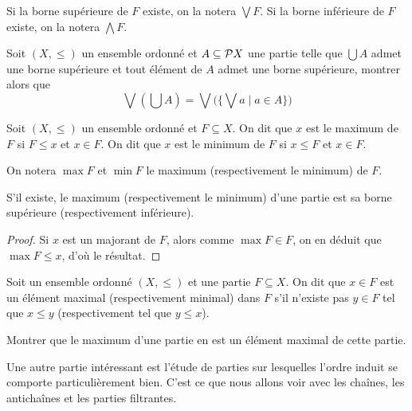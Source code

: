 \begin{notation}
  Si la borne supérieure de $F$ existe, on la notera $\bigvee F$. Si la borne
  inférieure de $F$ existe, on la notera $\bigwedge F$.
\end{notation}

\begin{exercise}
  Soit $(X,\leq)$ un ensemble ordonné et $A\subseteq \mathcal{P} X$ une partie
  telle que $\bigcup A$ admet une borne supérieure et tout élément de $A$ admet
  une borne supérieure, montrer alors que
  \[\bigvee (\bigcup A) =
  \bigvee\Big(\Big\{ \bigvee a \;\Big|\; a \in A\Big\}\Big)\]
\end{exercise}

\begin{definition}
  Soit $(X,\leq)$ un ensemble ordonné et $F\subseteq X$. On dit que $x$ est le
  maximum de $F$ si $F\leq x$ et $x\in F$. On dit que $x$ est le minimum de $F$
  si $x\leq F$ et $x\in F$.
\end{definition}

\begin{notation}
  On notera $\max F$ et $\min F$ le maximum (respectivement le minimum) de $F$.
\end{notation}

\begin{property}
  S'il existe, le maximum (respectivement le minimum) d'une partie est sa borne
  supérieure (respectivement inférieure).
\end{property}

\begin{proof}
  Si $x$ est un majorant de $F$, alors comme $\max F \in F$, on en déduit que
  $\max F \leq x$, d'où le résultat.
\end{proof}

\begin{definition}
  Soit un ensemble ordonné $(X,\leq)$ et une partie $F\subseteq X$. On dit que
  $x \in F$ est un élément maximal (respectivement minimal) dans $F$ s'il
  n'existe pas $y\in F$ tel que $x\leq y$ (respectivement tel que $y\leq x$).
\end{definition}

\begin{exercise}
  Montrer que le maximum d'une partie en est un élément maximal de cette partie.
\end{exercise}

Une autre partie intéressant est l'étude de parties sur lesquelles l'ordre induit
se comporte particulièrement bien. C'est ce que nous allons voir avec les
chaînes, les antichaînes et les parties filtrantes.

